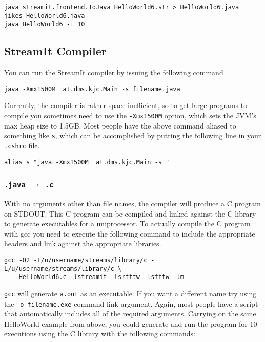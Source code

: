 \begin{verbatim}
java streamit.frontend.ToJava HelloWorld6.str > HelloWorld6.java
jikes HelloWorld6.java
java HelloWorld6 -i 10
\end{verbatim}

\subsection{StreamIt Compiler}
You can run the StreamIt compiler by issuing the following command
\begin{verbatim}
java -Xmx1500M  at.dms.kjc.Main -s filename.java
\end{verbatim}

Currently, the compiler is rather space inefficient, so to get large 
programs to compile you sometimes need to use the {\tt -Xmx1500M} option,
which sets the JVM's max heap size to 1.5GB.
Most people have the above command aliased to something like {\tt s}, which
can be accomplished by putting the following line in your {\tt .cshrc} file.

\begin{verbatim}
alias s "java -Xmx1500M  at.dms.kjc.Main -s "
\end{verbatim}


\subsubsection{{\tt .java} $\rightarrow$ {\tt .c}}
With no arguments other than file names, the compiler will produce
a C program on STDOUT. This C program can be compiled 
and linked against the C library to generate executables for a 
uniprocessor. To actually compile the C program with gcc 
you need to execute the following command to include the appropriate
headers and link against the appropriate libraries.

\begin{verbatim}
gcc -O2 -I/u/username/streams/library/c -L/u/username/streams/library/c \
    HelloWorld6.c -lstreamit -lsrfftw -lsfftw -lm
\end{verbatim}

{\tt gcc} will generate {\tt a.out} as an executable. If you want a different
name try using the {\tt -o filename.exe} command link argument.
Again, most people have a script that
automatically includes all of the required arguments.
Carrying on the same HelloWorld example from above, you could generate
and run the program for 10 executions using the C library with the following
commands:

